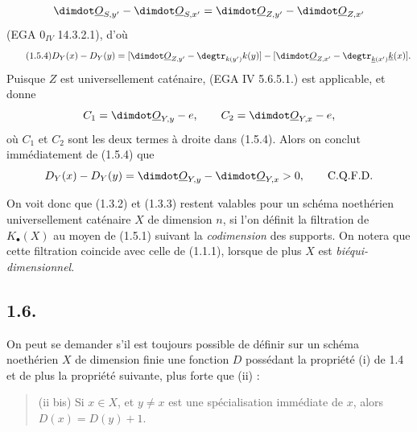 
\[
\dimdot\underline{O}_{S,y'}-\dimdot\underline{O}_{S,x'}=\dimdot\underline{O}_{Z,y'}-\dimdot\underline{O}_{Z,x'}
\]
(EGA $0_{IV}$ 14.3.2.1), d'où
\begin{equation}\tag{1.5.4}
D_Y(x)-D_Y(y)=
[\dimdot\underline{O}_{Z,y'}-\degtr_{k(y')}k(y)]-[\dimdot\underline{O}_{Z,x'}-\degtr_{\underline{k}(x')}\underline{k}(x)].
\end{equation}
Puisque $Z$ est universellement caténaire, (EGA IV 5.6.5.1.) est applicable, et donne
\[
C_1=\dimdot\underline{O}_{Y,y}-e,\qquad C_2=\dimdot\underline{O}_{Y,x}-e,
\]
où $C_1$ et $C_2$ sont les deux termes à droite dans (1.5.4). Alors on conclut immédiatement de (1.5.4) que
\[
D_Y(x)-D_Y(y)=\dimdot\underline{O}_{Y,y}-\dimdot\underline{O}_{Y,x}>0,\qquad \text{C.Q.F.D.}
\]

On voit donc que (1.3.2) et (1.3.3) restent valables pour un schéma noethérien universellement caténaire $X$ de dimension $n$, si l'on définit la filtration de $K_\bullet(X)$ au moyen de (1.5.1) suivant la \emph{codimension} des supports. On notera que cette filtration coincide avec celle de (1.1.1), lorsque de plus $X$ est \emph{biéqui-dimensionnel}.

\subsection*{1.6.}
On peut se demander s'il est toujours possible de définir sur un schéma noethérien $X$ de dimension finie une fonction $D$ possédant la propriété (i) de 1.4 et de plus la propriété suivante, plus forte que (ii) :
\begin{quote}
(ii bis) Si $x\in X$, et $y\ne x$ est une spécialisation immédiate de $x$, alors $D(x)=D(y)+1$.
\end{quote}
